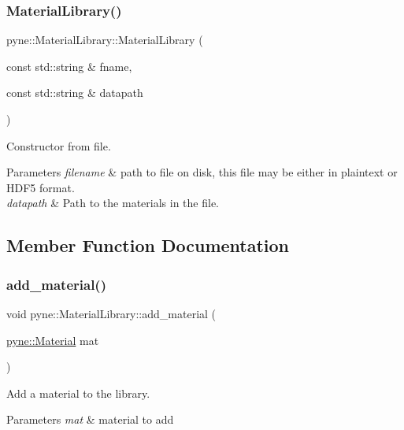 \subsubsection{\texorpdfstring{Material\+Library()}{MaterialLibrary()}}
{\footnotesize\ttfamily pyne\+::\+Material\+Library\+::\+Material\+Library (\begin{DoxyParamCaption}\item[{const std\+::string \&}]{fname,  }\item[{const std\+::string \&}]{datapath }\end{DoxyParamCaption})}



Constructor from file. 


\begin{DoxyParams}{Parameters}
{\em filename} & path to file on disk, this file may be either in plaintext or H\+D\+F5 format. \\
\hline
{\em datapath} & Path to the materials in the file. \\
\hline
\end{DoxyParams}


\subsection{Member Function Documentation}
\mbox{\label{classpyne_1_1_material_library_a720dba099f6e634c234fc9d261e89e2d}} 
\subsubsection{\texorpdfstring{add\+\_\+material()}{add\_material()}\hspace{0.1cm}{\footnotesize\ttfamily [1/2]}}
{\footnotesize\ttfamily void pyne\+::\+Material\+Library\+::add\+\_\+material (\begin{DoxyParamCaption}\item[{\hyperlink{classpyne_1_1_material}{pyne\+::\+Material}}]{mat }\end{DoxyParamCaption})}



Add a material to the library. 


\begin{DoxyParams}{Parameters}
{\em mat} & material to add \\
\hline
\end{DoxyParams}
\mbox{\label{classpyne_1_1_material_library_a4231a77add5e603588b3fe62531fe2dd}} 
